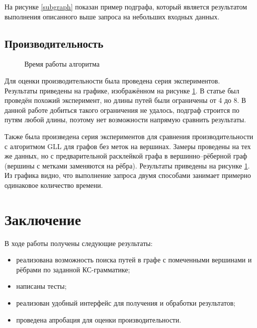 \documentclass[14pt]{matmex-diploma}
\begin{document}
На рисунке \ref{subgraph} показан пример подграфа, который является результатом выполнения описанного выше запроса на небольших входных данных.

\subsection{Производительность}

\begin{figure}
\begin{center}
\end{center}
\caption{Время работы алгоритма}
\label{time}
\end{figure}

Для оценки производительности была проведена серия экспериментов. Результаты приведены на графике, изображённом на рисунке \ref{time}. В статье \cite{subgraph} был проведён похожий эксперимент, но длины путей были ограничены от 4 до 8. В данной работе добиться такого ограничения не удалось, подграф строится по путям любой длины, поэтому нет возможности напрямую сравнить результаты.

Также была произведена серия экспериментов для сравнения производительности с алгоритмом GLL для графов без меток на вершинах. Замеры проведены на тех же данных, но с предварительной расклейкой графа в вершинно--рёберной граф (вершины с метками заменяются на рёбра). Результаты приведены на рисунке \ref{time}. Из графика видно, что выполнение запроса двумя способами занимает примерно одинаковое количество времени.

\section{Заключение}
В ходе работы получены следующие результаты:
\begin{itemize}
    \item реализована возможность поиска путей в графе с помеченными вершинами и рёбрами по заданной КС-грамматике;
    \item написаны тесты;
    \item реализован удобный интерфейс для получения и обработки результатов;
    \item проведена апробация для оценки производительности.
\end{itemize}
\end{document}
